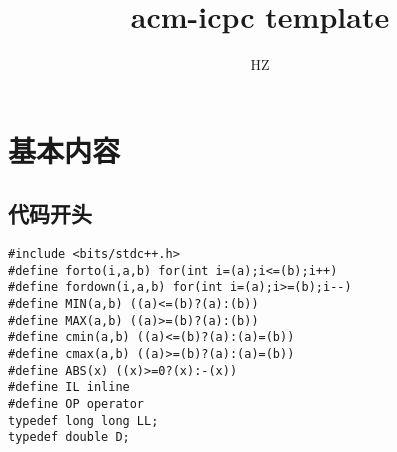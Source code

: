 \documentclass{article}
\begin{document}
\title{acm-icpc template}
\author{HZ}
\maketitle

\tableofcontents

\section{基本内容}

\subsection{代码开头}
\begin{lstlisting}
#include <bits/stdc++.h>
#define forto(i,a,b) for(int i=(a);i<=(b);i++)
#define fordown(i,a,b) for(int i=(a);i>=(b);i--)
#define MIN(a,b) ((a)<=(b)?(a):(b))
#define MAX(a,b) ((a)>=(b)?(a):(b))
#define cmin(a,b) ((a)<=(b)?(a):(a)=(b))
#define cmax(a,b) ((a)>=(b)?(a):(a)=(b))
#define ABS(x) ((x)>=0?(x):-(x))
#define IL inline
#define OP operator
typedef long long LL;
typedef double D;
\end{lstlisting}
\end{document}
